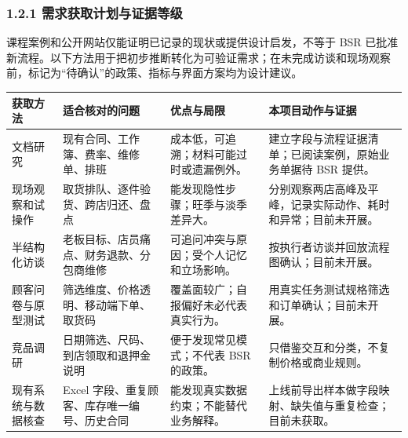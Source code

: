 \subsubsection{1.2.1 需求获取计划与证据等级}

课程案例和公开网站仅能证明已记录的现状或提供设计启发，不等于 BSR 已批准新流程。以下方法用于把初步推断转化为可验证需求；在未完成访谈和现场观察前，标记为``待确认''的政策、指标与界面方案均为设计建议。

{\def\LTcaptype{none} %
\begin{longtable}[]{@{}
  >{\centering\arraybackslash}p{}
  >{\raggedright\arraybackslash}p{}
  >{\raggedright\arraybackslash}p{}
  >{\raggedright\arraybackslash}p{}@{}}
\toprule\noalign{}\rowcolor{TableHead}
\begin{minipage}[b]{\linewidth}\color{white}\bfseries\centering
\textbf{获取方法}
\end{minipage} & \begin{minipage}[b]{\linewidth}\color{white}\bfseries\centering
\textbf{适合核对的问题}
\end{minipage} & \begin{minipage}[b]{\linewidth}\color{white}\bfseries\centering
\textbf{优点与局限}
\end{minipage} & \begin{minipage}[b]{\linewidth}\color{white}\bfseries\centering
\textbf{本项目动作与证据}
\end{minipage} \\
\midrule\noalign{}
\endhead
\bottomrule\noalign{}
\endlastfoot
文档研究 & 现有合同、工作簿、费率、维修单、排班 & 成本低，可追溯；材料可能过时或遗漏例外。 & 建立字段与流程证据清单；已阅读案例，原始业务单据待 BSR 提供。 \\
现场观察和试操作 & 取货排队、逐件验货、跨店归还、盘点 & 能发现隐性步骤；旺季与淡季差异大。 & 分别观察两店高峰及平峰，记录实际动作、耗时和异常；目前未开展。 \\
半结构化访谈 & 老板目标、店员痛点、财务退款、分包商维修 & 可追问冲突与原因；受个人记忆和立场影响。 & 按执行者访谈并回放流程图确认；目前未开展。 \\
顾客问卷与原型测试 & 筛选维度、价格透明、移动端下单、取货码 & 覆盖面较广；自报偏好未必代表真实行为。 & 用真实任务测试规格筛选和订单确认；目前未开展。 \\
竞品调研 & 日期筛选、尺码、到店领取和退押金说明 & 便于发现常见模式；不代表 BSR 的政策。 & 只借鉴交互和分类，不复制价格或商业规则。 \\
现有系统与数据核查 & Excel 字段、重复顾客、库存唯一编号、历史合同 & 能发现真实数据约束；不能替代业务解释。 & 上线前导出样本做字段映射、缺失值与重复检查；目前未获取。 \\
\end{longtable}
}

